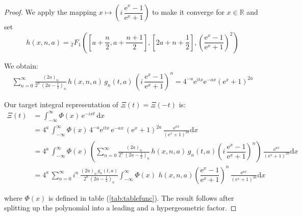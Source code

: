 \documentclass[a4paper,11pt,twoside]{amsart}
\begin{document}
\begin{proof}
We apply the mapping $x \mapsto \left(i\,\dfrac{\textrm{e}^{x}-1}{\textrm{e}^{x}+1}\right)$ to make it converge for $x \in \mathbb{R}$ and set $$h(x,n,a) = {}_2F_1\left(\left[a+\frac{n}{2}, a+\frac{n+1}{2}\right],\left[2a+n+\frac12\right],\left(\dfrac{\textrm{e}^{x}-1}{\textrm{e}^{x}+1}\right)^2\right)$$

We obtain:
\begin{align}
 \sum_{n=0}^\infty \frac{(2a)_n}{2^n\,\left(2a-\frac12\right)_n}\,h(x,n,a) \,g_n(t,a)\,\left(i\,\dfrac{\textrm{e}^{x}-1}{\textrm{e}^{x}+1}\right)^n = 4^{-a}\mathrm{e}^{itx}\mathrm{e}^{-ax}\left(\mathrm{e}^x+1\right)^{2a} 
\end{align}

Our target integral representation of $\Xi(t) = \Xi(-t)$ is:
\begin{align}
  \Xi(t)&=\int_{-\infty}^\infty \Phi(x)\,\mathrm{e}^{-ixt}\, \mathrm{d}x\\
  &= 4^a\, \int_{-\infty}^\infty \Phi(x)\,4^{-a}\mathrm{e}^{itx}\,\mathrm{e}^{-ax}\,\left(\mathrm{e}^x+1\right)^{2a}\,\frac{\mathrm{e}^{ax}}{\left(\mathrm{e}^x+1\right)^{2a}} \mathrm{d}x \\
   &= 4^a\,\int_{-\infty}^\infty \Phi(x)\, \left(\sum_{n=0}^\infty \frac{(2a)_n}{2^n\,\left(2a-\frac12\right)_n}\,h(x,n,a) \,g_n(t,a)\left(i\,\dfrac{\textrm{e}^{x}-1}{\textrm{e}^{x}+1}\right)^n\right)\,\frac{\mathrm{e}^{ax}}{\left(\mathrm{e}^x+1\right)^{2a}} \mathrm{d}x\\
   &= 4^a\, \sum_{n=0}^\infty i^n\,\frac{(2a)_n \,g_n(t,a)}{2^n\,\left(2a-\frac12\right)_n}\int_{-\infty}^\infty \Phi(x)\,\,h(x,n,a)\left(\dfrac{\textrm{e}^{x}-1}{\textrm{e}^{x}+1}\right)^n\,\frac{\mathrm{e}^{ax}}{\left(\mathrm{e}^x+1\right)^{2a}} \mathrm{d}x
\end{align}

where $\Phi(x)$ is defined in table (\ref{tab:tablefunc}). The result follows after splitting up the polynomial into a leading and a hypergeometric factor.
\end{proof}
\end{document}
